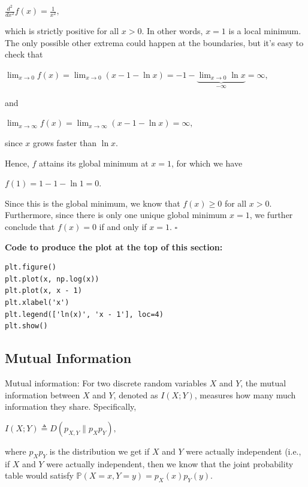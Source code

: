 \documentclass[6008notes.tex]{subfiles}
\begin{document}
{\centering$\frac{d^{2}}{dx^{2}}f(x)=\frac{1}{x^{2}},$ \par}

which is strictly positive for all $x>0$. In other words, $x=1$ is a local minimum. The only possible other extrema could happen at the boundaries, but it's easy to check that

{\centering$\lim _{x\rightarrow 0}f(x) = \lim _{x\rightarrow 0} (x - 1 - \ln x) = -1 - \underbrace{\lim _{x\rightarrow 0} \ln x}_{-\infty } = \infty ,$ \par}

and

{\centering$\lim _{x\rightarrow \infty }f(x) = \lim _{x\rightarrow \infty } (x - 1 - \ln x) = \infty ,$ \par}

since $x$ grows faster than $\ln x$.

Hence, $f$ attains its global minimum at $x=1$, for which we have

{\centering$f(1)=1-1-\ln 1=0.$ \par}

Since this is the global minimum, we know that $f(x) \ge 0$ for all $x>0$. Furthermore, since there is only one unique global minimum $x=1$, we further conclude that $f(x)=0$ if and only if $x=1$. $\square$

\textbf{Code to produce the plot at the top of this section:}

\begin{lstlisting}
plt.figure()
plt.plot(x, np.log(x))
plt.plot(x, x - 1)
plt.xlabel('x')
plt.legend(['ln(x)', 'x - 1'], loc=4)
plt.show()
\end{lstlisting}

\subsection{Mutual Information}

Mutual information: For two discrete random variables $X$ and $Y$, the mutual information between $X$ and $Y$, denoted as $I(X;Y)$, measures how many much information they share. Specifically,

{\centering$I(X;Y)\triangleq D(p_{X,Y}\parallel p_{X}p_{Y}),$ \par}
 
where $p_Xp_Y$ is the distribution we get if $X$ and $Y$ were actually independent (i.e., if $X$ and $Y$ were actually independent, then we know that the joint probability table would satisfy $\mathbb {P}(X=x,Y=y)=p_{X}(x)p_{Y}(y)$.
\end{document}
